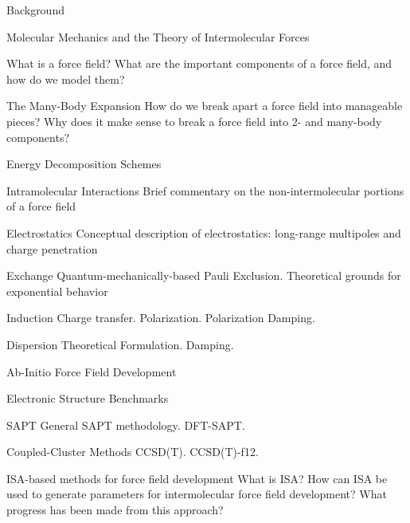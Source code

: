 \begin{chapter}{Background}



\begin{section}{Molecular Mechanics and the Theory of Intermolecular Forces}

What is a force field?
What are the important components of a force field, and how do we model them?
%
\begin{subsection}{The Many-Body Expansion}
How do we break apart a force field into manageable pieces? Why does it make
sense to break a force field into 2- and many-body components?
\end{subsection}
\begin{subsection}{Energy Decomposition Schemes}
\begin{subsubsection}{Intramolecular Interactions}
Brief commentary on the non-intermolecular portions of a force field
\end{subsubsection}
\begin{subsubsection}{Electrostatics}
Conceptual description of electrostatics: long-range multipoles and charge
penetration
\end{subsubsection}
\begin{subsubsection}{Exchange}
Quantum-mechanically-based Pauli Exclusion.
Theoretical grounds for exponential behavior
\end{subsubsection}
\begin{subsubsection}{Induction}
Charge transfer.
Polarization.
Polarization Damping.
\end{subsubsection}
\begin{subsubsection}{Dispersion}
Theoretical Formulation.
Damping.
\end{subsubsection}
\end{subsection}
%
\end{section}


\begin{section}{Ab-Initio Force Field Development}
\begin{subsection}{Electronic Structure Benchmarks}
\begin{subsubsection}{SAPT}
General SAPT methodology.
DFT-SAPT.
\end{subsubsection}
\begin{subsubsection}{Coupled-Cluster Methods}
CCSD(T).
CCSD(T)-f12.
\end{subsubsection}
\end{subsection}
\end{section}


\begin{section}{ISA-based methods for force field development}
What is ISA? How can ISA be used to generate parameters for intermolecular
force field development? What progress has been made from this approach?
\end{section}



\end{chapter}
